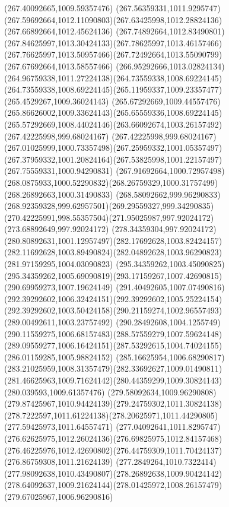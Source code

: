 {{	\lineto(267.40092665,1009.59357476)
	\lineto(267.56359331,1011.9295747)
	\curveto(267.59692664,1012.11090803)(267.63425998,1012.28824136)(267.66892664,1012.45624136)
	\curveto(267.74892664,1012.83490801)(267.84625997,1013.30424133)(267.78625997,1013.46157466)
	\curveto(267.76625997,1013.50957466)(267.72492664,1013.55090799)(267.67692664,1013.58557466)
	\curveto(266.95292666,1013.02824134)(264.96759338,1011.27224138)(264.73559338,1008.69224145)
	\curveto(264.73559338,1008.69224145)(265.11959337,1009.23357477)(265.4529267,1009.36024143)
	\curveto(265.67292669,1009.44557476)(265.86626002,1009.33624143)(265.65559336,1008.69224145)
	\curveto(265.57292669,1008.44024146)(263.66092674,1003.26157492)(267.42225998,999.68024167)
	\curveto(267.42225998,999.68024167)(267.01025999,1000.73357498)(267.25959332,1001.05357497)
	\curveto(267.37959332,1001.20824164)(267.53825998,1001.22157497)(267.75559331,1000.94290831)
	\curveto(267.91692664,1000.72957498)(268.0875933,1000.52290832)(268.26759329,1000.31757499)
	\lineto(268.26892663,1000.31490833)
	\curveto(268.58092662,999.96290833)(268.92359328,999.62957501)(269.29559327,999.34290835)
	\curveto(270.42225991,998.55357504)(271.95025987,997.92024172)(273.68892649,997.92024172)
	\curveto(278.34359304,997.92024172)(280.80892631,1001.12957497)(282.17692628,1003.82424157)
	\curveto(282.11692628,1003.89490824)(282.04892628,1003.96290823)(281.97159295,1004.03090823)
	\moveto(295.34359262,1003.45090825)
	\curveto(295.34359262,1005.69090819)(293.17159267,1007.42690815)(290.69959273,1007.19624149)
	\curveto(291.40492605,1007.07490816)(292.39292602,1006.32424151)(292.39292602,1005.25224154)
	\curveto(292.39292602,1003.50424158)(290.21159274,1002.96557493)(289.00492611,1003.23757492)
	\curveto(290.28492608,1004.1255749)(290.11559275,1006.68157483)(288.57559279,1007.59624148)
	\curveto(289.09559277,1006.16424151)(287.53292615,1004.74024155)(286.01159285,1005.98824152)
	\curveto(285.16625954,1006.68290817)(283.21025959,1008.31357479)(282.33692627,1009.01490811)
	\curveto(281.46625963,1009.71624142)(280.44359299,1009.30824143)(280.039593,1009.61357476)
	\curveto(279.58092634,1009.96290808)(279.87425967,1010.94424139)(279.24759302,1011.30824138)
	\curveto(278.7222597,1011.61224138)(278.20625971,1011.44290805)(277.59425973,1011.64557471)
	\curveto(277.04092641,1011.8295747)(276.62625975,1012.26024136)(276.69825975,1012.84157468)
	\curveto(276.46225976,1012.42690802)(276.44759309,1011.70424137)(276.86759308,1011.21624139)
	\curveto(277.2849264,1010.7322414)(277.98092638,1010.43490807)(278.26892638,1009.90424142)
	\curveto(278.64092637,1009.21624144)(278.01425972,1008.26157479)(279.67025967,1006.96290816)
}}
